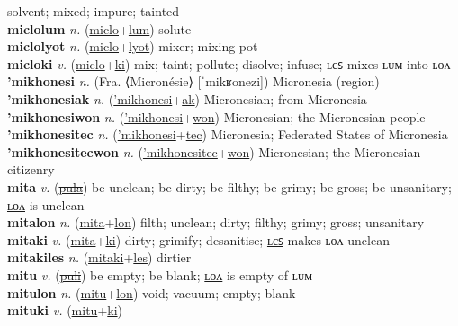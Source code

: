 solvent; mixed; impure; tainted \label{miclolon} \\
\textbf{miclolum} \textit{n.} (\hyperref[miclo]{miclo}+\hyperref[lum]{lum})
solute \label{miclolum} \\
\textbf{miclolyot} \textit{n.} (\hyperref[miclo]{miclo}+\hyperref[lyot]{lyot})
mixer; mixing pot \label{miclolyot} \\
\textbf{micloki} \textit{v.} (\hyperref[miclo]{miclo}+\hyperref[ki]{ki})
mix; taint; pollute; disolve; infuse; ʟєꜱ mixes ʟᴜᴍ into ʟᴏᴧ \label{micloki} \\
\textbf{'mikhonesi} \textit{n.} (Fra. ⟨Micronésie⟩ [ˈmikʁonezi])
Micronesia (region) \label{'mikhonesi} \\
\textbf{'mikhonesiak} \textit{n.} (\hyperref['mikhonesi]{'mikhonesi}+\hyperref[ak]{ak})
Micronesian; from Micronesia \label{'mikhonesiak} \\
\textbf{'mikhonesiwon} \textit{n.} (\hyperref['mikhonesi]{'mikhonesi}+\hyperref[won]{won})
Micronesian; the Micronesian people \label{'mikhonesiwon} \\
\textbf{'mikhonesitec} \textit{n.} (\hyperref['mikhonesi]{'mikhonesi}+\hyperref[tec]{tec})
Micronesia; Federated States of Micronesia \label{'mikhonesitec} \\
\textbf{'mikhonesitecwon} \textit{n.} (\hyperref['mikhonesitec]{'mikhonesitec}+\hyperref[won]{won})
Micronesian; the Micronesian citizenry \label{'mikhonesitecwon} \\
\textbf{mita} \textit{v.} (\hyperref[pula]{\sout{pula}})
be unclean; be dirty; be filthy; be grimy; be gross; be unsanitary; \hyperref[mitalon]{ʟᴏᴧ} is unclean \label{mita} \\
\textbf{mitalon} \textit{n.} (\hyperref[mita]{mita}+\hyperref[lon]{lon})
filth; unclean; dirty; filthy; grimy; gross; unsanitary \label{mitalon} \\
\textbf{mitaki} \textit{v.} (\hyperref[mita]{mita}+\hyperref[ki]{ki})
dirty; grimify; desanitise; \hyperref[mitakiles]{ʟєꜱ} makes ʟᴏᴧ unclean \label{mitaki} \\
\textbf{mitakiles} \textit{n.} (\hyperref[mitaki]{mitaki}+\hyperref[les]{les})
dirtier \label{mitakiles} \\
\textbf{mitu} \textit{v.} (\hyperref[puli]{\sout{puli}})
be empty; be blank; \hyperref[mitulon]{ʟᴏᴧ} is empty of ʟᴜᴍ \label{mitu} \\
\textbf{mitulon} \textit{n.} (\hyperref[mitu]{mitu}+\hyperref[lon]{lon})
void; vacuum; empty; blank \label{mitulon} \\
\textbf{mituki} \textit{v.} (\hyperref[mitu]{mitu}+\hyperref[ki]{ki})
